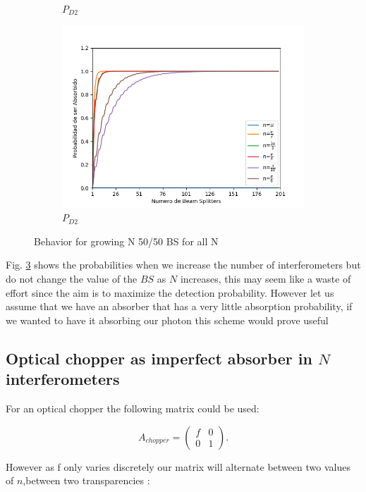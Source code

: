 \documentclass[12pt]{article}
\begin{document}
\begin{figure}[!htb]
\begin{subfigure}[b]{0.45\linewidth}
\caption{$P_{D2}$}
\label{fig:westminster_aerea}
\end{subfigure}
\begin{subfigure}[b]{0.45\linewidth}
\includegraphics[width=\linewidth]{images/BsFijo_azumaabs.png}
\caption{$P_{D2}$}
\label{fig:BS1}
\end{subfigure}
\caption{Behavior for growing N 50/50 BS for all N}
\label{growing 50/50}
\end{figure} 
 
 Fig. \ref{growing 50/50} shows the probabilities when we increase the number of interferometers but do not change the value of the $BS$ as $N$ increases, this may seem like a waste of effort since the aim is to maximize the detection probability. However let us assume that we have an absorber that has a very little absorption probability, if we wanted to have it absorbing our photon this scheme would prove useful

\subsection{Optical chopper as imperfect absorber in $N$ interferometers}
For an optical chopper the following matrix could be used:

\begin{equation}
A_{chopper}=\begin{pmatrix} f & 0 \\ 0 & 1 \end{pmatrix}.
\end{equation}

However as f only varies discretely our matrix will alternate between two values of $n$,between two transparencies :
\end{document}
